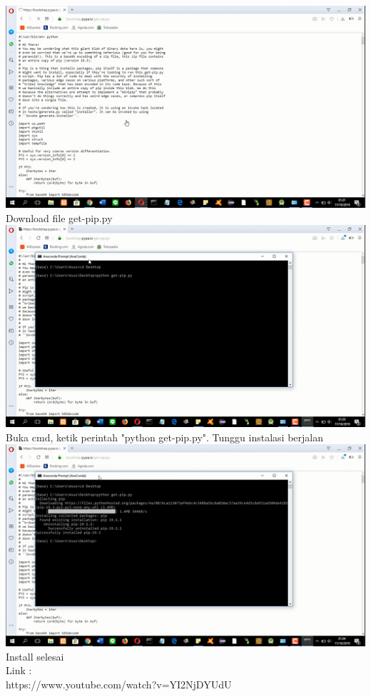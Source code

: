 \begin{enumerate}
\includegraphics{gambar/pip_3.png}
Download file get-pip.py\\

\includegraphics{gambar/pip_4.png}
Buka cmd, ketik perintah "python get-pip.py". Tunggu instalasi berjalan\\

\includegraphics{gambar/pip_5.png}
Install selesai\\
Link :\\
https://www.youtube.com/watch?v=YI2NjDYU\textunderscore dU



\end{enumerate}
